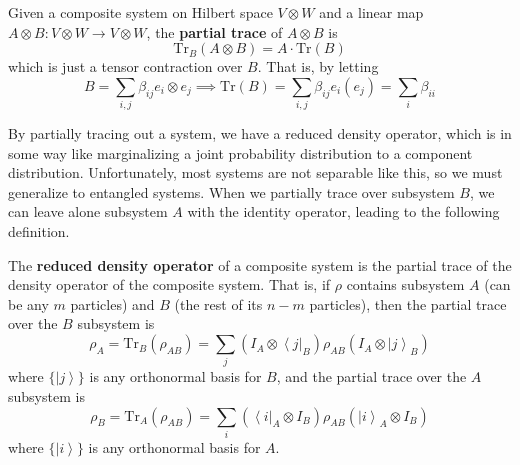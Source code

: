 \documentclass{article}
\newcommand{\ket}[1]{\ensuremath{\left|#1\right\rangle}}
\newcommand{\bra}[1]{\ensuremath{\left\langle#1\right|}}
\begin{document}
    \begin{definition}
      Given a composite system on Hilbert space $V \otimes W$ and a linear map $A \otimes B: V \otimes W \rightarrow V \otimes W$, the \textbf{partial trace} of $A \otimes B$ is 
      \begin{equation}
        \mathrm{Tr}_B (A \otimes B) = A \cdot \mathrm{Tr}(B)
      \end{equation}
      which is just a tensor contraction over $B$. That is, by letting 
      \begin{equation}
        B = \sum_{i, j} \beta_{ij} e_i \otimes e_j \implies \mathrm{Tr}(B) = \sum_{i, j} \beta_{ij} e_i (e_j) = \sum_i \beta_{ii}
      \end{equation}
    \end{definition}

    By partially tracing out a system, we have a reduced density operator, which is in some way like marginalizing a joint probability distribution to a component distribution. Unfortunately, most systems are not separable like this, so we must generalize to entangled systems. When we partially trace over subsystem $B$, we can leave alone subsystem $A$ with the identity operator, leading to the following definition. 

    \begin{definition}
      The \textbf{reduced density operator} of a composite system is the partial trace of the density operator of the composite system. That is, if $\rho$ contains subsystem $A$ (can be any $m$ particles) and $B$ (the rest of its $n -m$ particles), then the partial trace over the $B$ subsystem is 
      \begin{equation}
        \rho_A = \mathrm{Tr}_{B} (\rho_{AB}) = \sum_j (I_A \otimes \bra{j}_B) \rho_{AB} (I_A \otimes \ket{j}_B)
      \end{equation}
      where $\{\ket{j}\}$ is any orthonormal basis for $B$, and the partial trace over the $A$ subsystem is 
      \begin{equation}
        \rho_B = \mathrm{Tr}_{A} (\rho_{AB}) = \sum_i (\bra{i}_A \otimes I_B) \rho_{AB} (\ket{i}_A \otimes I_B)
      \end{equation}
      where $\{\ket{i}\}$ is any orthonormal basis for $A$.
    \end{definition}
\end{document}
